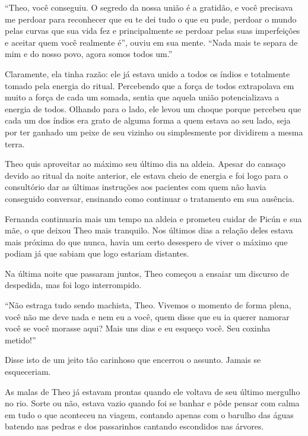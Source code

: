 ``Theo, você conseguiu. O segredo da nossa união é a gratidão, e você
precisava me perdoar para reconhecer que eu te dei tudo o que eu pude,
perdoar o mundo pelas curvas que sua vida fez e principalmente se
perdoar pelas suas imperfeições e aceitar quem você realmente é'', ouviu
em sua mente. ``Nada mais te separa de mim e do nosso povo, agora somos
todos um.''

Claramente, ela tinha razão: ele já estava unido a todos os índios e
totalmente tomado pela energia do ritual. Percebendo que a força de
todos extrapolava em muito a força de cada um somada, sentia que aquela união
potencializava a energia de todos. Olhando para o lado, ele levou um
choque porque percebeu que cada um dos índios era grato de alguma forma
a quem estava ao seu lado, seja por ter ganhado um peixe de seu vizinho
ou simplesmente por dividirem a mesma terra.

\asterisc


Theo quis aproveitar ao máximo seu último dia na aldeia. Apesar do
cansaço devido ao ritual da noite anterior, ele estava cheio de energia
e foi logo para o consultório dar as últimas instruções aos pacientes
com quem não havia conseguido conversar, ensinando como continuar o
tratamento em sua ausência.

Fernanda continuaria mais um tempo na aldeia e prometeu cuidar de Picún
e sua mãe, o que deixou Theo mais tranquilo. Nos últimos dias a relação
deles estava mais próxima do que nunca, havia um certo desespero de
viver o máximo que podiam já que sabiam que logo estariam distantes.

Na última noite que passaram juntos, Theo começou a ensaiar um discurso
de despedida, mas foi logo interrompido.

``Não estraga tudo sendo machista, Theo. Vivemos o momento de forma
plena, você não me deve nada e nem eu a você, quem disse que eu ia
querer namorar você se você morasse aqui? Mais uns dias e eu esqueço
você. Seu coxinha metido!''

Disse isto de um jeito tão carinhoso que encerrou o assunto. Jamais se
esqueceriam.

As malas de Theo já estavam prontas quando ele voltava de seu último
mergulho no rio. Sorte ou não, estava vazio quando foi se banhar e pôde
pensar com calma em tudo o que aconteceu na viagem, contando apenas com
o barulho das águas batendo nas pedras e dos passarinhos cantando
escondidos nas árvores.

